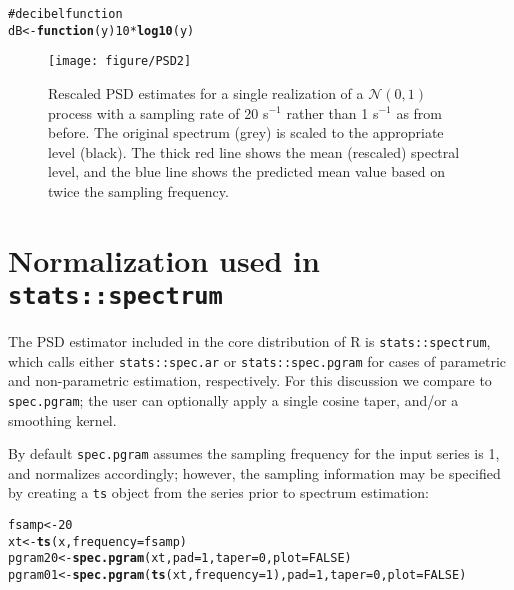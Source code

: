 \documentclass[11pt]{article}\usepackage{graphicx, color}
\makeatletter
\def\maxwidth{ %
  \ifdim\Gin@nat@width>\linewidth
    \linewidth
  \else
    \Gin@nat@width
  \fi
}
\newcommand{\hlfunctioncall}[1]{\textcolor[rgb]{0.501960784313725,0,0.329411764705882}{\textbf{#1}}}%
\newcommand{\hlcomment}[1]{\textcolor[rgb]{0.180392156862745,0.6,0.341176470588235}{#1}}%
\newenvironment{kframe}{%
 \def\at@end@of@kframe{}%
 \ifinner\ifhmode%
  \def\at@end@of@kframe{\end{minipage}}%
  \begin{minipage}{\columnwidth}%
 \fi\fi%
 \def\FrameCommand##1{\hskip\@totalleftmargin \hskip-\fboxsep
 \colorbox{shadecolor}{##1}\hskip-\fboxsep
     \hskip-\linewidth \hskip-\@totalleftmargin \hskip\columnwidth}%
 \MakeFramed {\advance\hsize-\width
   \@totalleftmargin\z@ \linewidth\hsize
   \@setminipage}}%
 {\par\unskip\endMakeFramed%
 \at@end@of@kframe}
\newenvironment{knitrout}{}{} %
\newcommand{\Rcmd}[1]{\texttt{#1}}
\makeatother
\begin{document}
\begin{knitrout}
\color{fgcolor}\begin{kframe}
\begin{alltt}
\hlcomment{# decibel function}
dB <- \hlfunctioncall{function}(y) 10 * \hlfunctioncall{log10}(y)
\end{alltt}
\end{kframe}
\end{knitrout}

\begin{figure}[htb!]
\begin{center}
\begin{knitrout}
\color{fgcolor}
\texttt{[image: figure/PSD2]} 

\end{knitrout}

\caption{Rescaled PSD estimates for a single realization of a 
$\mathcal{N}(0,1)$ process with a sampling rate of 20 s$^{-1}$ rather
than 1 s$^{-1}$ as from before.  
The original spectrum (grey) is scaled to the appropriate level
(black).
The thick red line shows the mean (rescaled) spectral level, and the
blue line shows the predicted mean value based on twice the sampling
frequency.}
\label{fig:psdsamp}
\end{center}
\end{figure}

\section{Normalization used in \Rcmd{stats::spectrum}}

The PSD estimator included in
the core distribution of R is \Rcmd{stats::spectrum}, which
calls either \Rcmd{stats::spec.ar} or \Rcmd{stats::spec.pgram} for 
cases of
parametric and non-parametric estimation, respectively.  
For this discussion we compare to \Rcmd{spec.pgram};
the user can optionally apply a single cosine taper, 
and/or a smoothing kernel.

By default \Rcmd{spec.pgram} assumes the sampling frequency
for the input series is 1, and normalizes accordingly; however,
the sampling information may be specified by creating a \Rcmd{ts}
object from the series prior to spectrum estimation:

\begin{knitrout}
\color{fgcolor}\begin{kframe}
\begin{alltt}
fsamp <- 20
xt <- \hlfunctioncall{ts}(x, frequency = fsamp)
pgram20 <- \hlfunctioncall{spec.pgram}(xt, pad = 1, taper = 0, plot = FALSE)
pgram01 <- \hlfunctioncall{spec.pgram}(\hlfunctioncall{ts}(xt, frequency = 1), pad = 1, taper = 0, plot = FALSE)
\end{alltt}
\end{kframe}
\end{knitrout}
\end{document}
